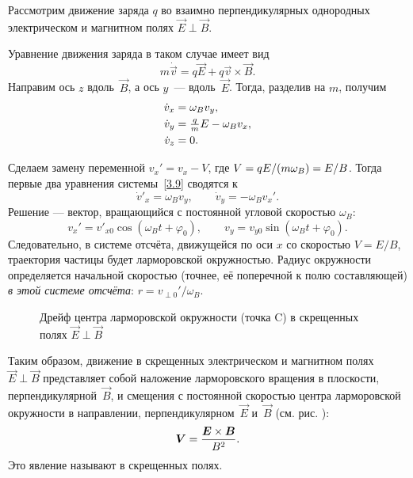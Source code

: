 Рассмотрим движение заряда $q$ во взаимно перпендикулярных однородных
электрическом и магнитном полях $\vec{E}\perp\vec{B}$.

Уравнение движения заряда в таком случае имеет вид
\[
m\dot{\vec{v}} = q\vec{E} + q \vec{v}\times \vec{B}.
\]
Направим ось $z$ вдоль~$\vec{B}$, а ось $y$~--- вдоль~$\vec{E}$.
Тогда, разделив на $m$, получим
\begin{equation}
    \eqmark{3.9}
    \begin{aligned}
        \dot{v}_x&=\omega_B v_y,\\
        \dot{v}_y&=\tfrac{q}{m}E-\omega_B v_x,\\
        \dot{v}_z&=0.
\end{aligned}
\end{equation}

Сделаем замену переменной $v_x' = v_x - V$,
где $V=qE/(m\omega_B) \hm= E/B$. Тогда первые два уравнения системы~\eqref{3.9}
сводятся к 
\[
\dot{v}'_x =\omega_B v_y,\qquad \dot{v}_y =-\omega_B v_x'.
\]
Решение --- вектор, вращающийся с постоянной угловой скоростью $\omega_B$:
\begin{equation*}
 v_x' = v'_{x0} \cos(\omega_B t + \varphi_0),\qquad
 v_y = v_{y0} \sin(\omega_B t + \varphi_0).
\end{equation*}
Следовательно, в системе отсчёта, движущейся по оси $x$ со скоростью
$V=E/B$, траектория частицы будет ларморовской окружностью.
Радиус окружности определяется начальной скоростью (точнее, её поперечной
к полю составляющей) \emph{в этой системе отсчёта}: $r=v_{\perp 0}'/\omega_B$.

\begin{figure}[h]
\centering
{}
\caption{Дрейф центра ларморовской окружности (точка C) в скрещенных полях
    $\vec{E}\perp\vec{B}$}
\end{figure}

Таким образом, движение в скрещенных электрическом и магнитном полях
$\vec{E}\perp \vec{B}$ представляет собой наложение
ларморовского вращения в плоскости, перпендикулярной~$\vec{B}$,
и смещения с постоянной скоростью центра ларморовской
окружности в направлении, перпендикулярном~$\vec{E}$ и~$\vec{B}$
 (см. рис. ):
\begin{equation}
\eqmark{Edrift}
\vec{V} = \frac{\vec{E}\times \vec{B}}{B^2}.
\end{equation}
Это явление называют  
в скрещенных полях.


